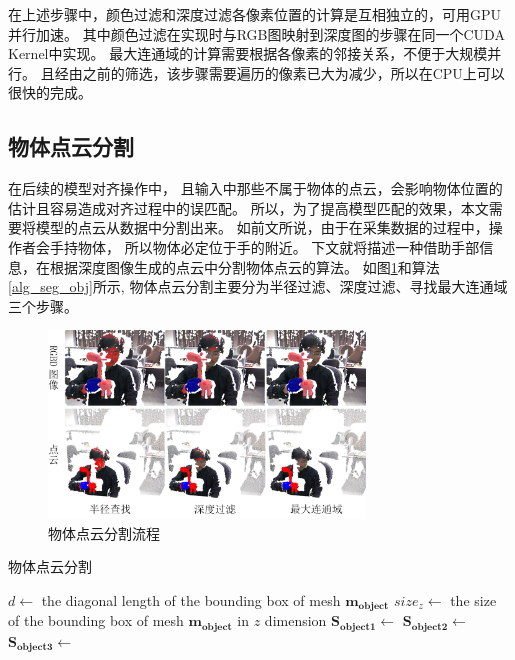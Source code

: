 在上述步骤中，颜色过滤和深度过滤各像素位置的计算是互相独立的，可用GPU并行加速。
其中颜色过滤在实现时与RGB图映射到深度图的步骤在同一个CUDA Kernel中实现。
最大连通域的计算需要根据各像素的邻接关系，不便于大规模并行。
且经由之前的筛选，该步骤需要遍历的像素已大为减少，所以在CPU上可以很快的完成。


\subsection{物体点云分割}
在后续的模型对齐操作中，
且输入中那些不属于物体的点云，会影响物体位置的估计且容易造成对齐过程中的误匹配。
所以，为了提高模型匹配的效果，本文需要将模型的点云从数据中分割出来。
如前文所说，由于在采集数据的过程中，操作者会手持物体，
所以物体必定位于手的附近。
下文就将描述一种借助手部信息，在根据深度图像生成的点云中分割物体点云的算法。
如图\ref{finding_object}和算法\ref{alg_seg_obj}所示,
物体点云分割主要分为半径过滤、深度过滤、寻找最大连通域三个步骤。
\begin{figure}[ht]
    \centering
    \includegraphics[width = 0.75\textwidth]{./Pictures/FindingObj.png}
    \caption{物体点云分割流程}
    \label{finding_object}
\end{figure}
\begin{algorithm}
    \caption{物体点云分割}
    \label{alg_seg_obj}
    \begin{algorithmic}[1]
            \State $d \gets$ the diagonal length of the bounding box of mesh $\bm{m_{object}}$
            \State $size_z \gets$ the size of the bounding box of mesh $\bm{m_{object}}$ in $z$ dimension
            \State $\bm{S_{object1}} \gets$ 
            \State $\bm{S_{object2}} \gets$ 
            \State $\bm{S_{object3}} \gets$ 
        \EndProcedure
    \end{algorithmic}
\end{algorithm} 


